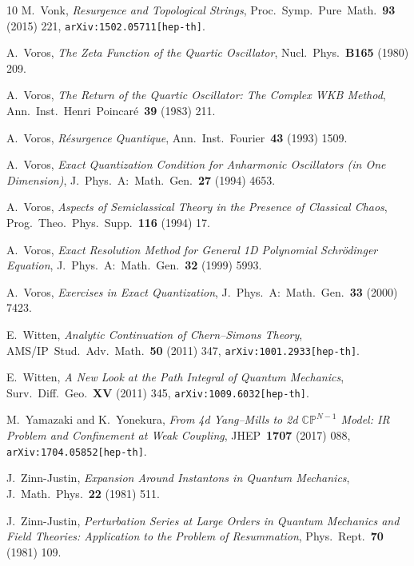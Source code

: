 \documentclass[11pt,a4paper]{article}
\def\BC{{\mathbb C}}
\def\BP{{\mathbb P}}
\begin{document}
\begin{thebibliography}{10}
M.~Vonk,
\textit{Resurgence and Topological Strings},
Proc.\ Symp.\ Pure\ Math.\ \textbf{93} (2015) 221,
\texttt{arXiv:1502.05711[hep-th]}.

A.~Voros,
\textit{The Zeta Function of the Quartic Oscillator},
Nucl.\ Phys.\ \textbf{B165} (1980) 209.

A.~Voros,
\textit{The Return of the Quartic Oscillator: The Complex WKB Method},
Ann.\ Inst.\ Henri\ Poincar\'e\ \textbf{39} (1983) 211.

A.~Voros,
\textit{R\'esurgence Quantique},
Ann.\ Inst.\ Fourier\ \textbf{43} (1993) 1509.

A.~Voros,
\textit{Exact Quantization Condition for Anharmonic Oscillators (in One Dimension)},
J.\ Phys.\ A:\ Math.\ Gen.\ \textbf{27} (1994) 4653.

A.~Voros,
\textit{Aspects of Semiclassical Theory in the Presence of Classical Chaos},
Prog.\ Theo.\ Phys.\ Supp.\ \textbf{116} (1994) 17.

A.~Voros,
\textit{Exact Resolution Method for General 1D Polynomial Schr\"odinger Equation},
J.\ Phys.\ A:\ Math.\ Gen.\ \textbf{32} (1999) 5993.

A.~Voros,
\textit{Exercises in Exact Quantization},
J.\ Phys.\ A:\ Math.\ Gen.\ \textbf{33} (2000) 7423.

E.~Witten,
\textit{Analytic Continuation of Chern--Simons Theory},
AMS/IP\ Stud.\ Adv.\ Math.\ \textbf{50} (2011) 347,
\texttt{arXiv:1001.2933[hep-th]}.

E.~Witten,
\textit{A New Look at the Path Integral of Quantum Mechanics},
Surv.\ Diff.\ Geo.\ \textbf{XV} (2011) 345,
\texttt{arXiv:1009.6032[hep-th]}.

M.~Yamazaki and K.~Yonekura,
\textit{From 4d Yang--Mills to 2d $\BC\BP^{N-1}$ Model: IR Problem and Confinement at Weak Coupling},
JHEP\ \textbf{1707} (2017) 088, 
\texttt{arXiv:1704.05852[hep-th]}.

J.~Zinn-Justin,
\textit{Expansion Around Instantons in Quantum Mechanics},
J.\ Math.\ Phys.\ \textbf{22} (1981) 511.

J.~Zinn-Justin,
\textit{Perturbation Series at Large Orders in Quantum Mechanics and Field Theories: Application to the Problem of Resummation},
Phys.\ Rept.\ \textbf{70} (1981) 109.


\end{thebibliography}
\end{document}
